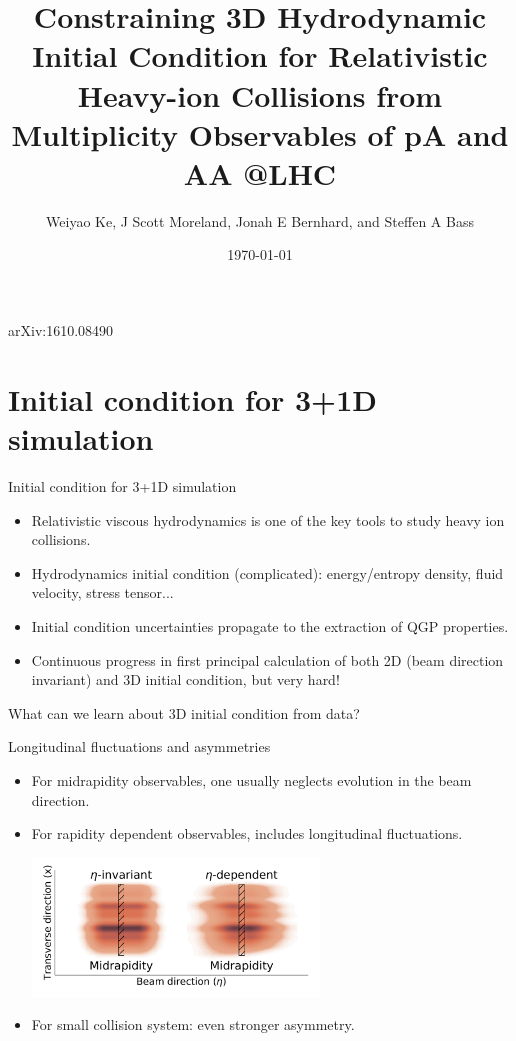 \documentclass[11pt]{beamer}
\author[Weiyao Ke]{Weiyao Ke, J Scott Moreland, Jonah E Bernhard, and Steffen A Bass}
\title[3D Initial Condition]{Constraining 3D Hydrodynamic Initial Condition for Relativistic Heavy-ion Collisions from Multiplicity Observables of pA and AA @LHC}
\institute{Duke University}
\date{\today}
\begin{document}
\begin{frame}
\titlepage
\begin{center}
\small arXiv:1610.08490
\end{center}
\end{frame}

\section{Initial condition for 3+1D simulation}
\begin{frame}{Initial condition for 3+1D simulation}
\begin{itemize}
\item Relativistic viscous hydrodynamics is one of the key tools to study heavy ion collisions.
\item Hydrodynamics initial condition (complicated): energy/entropy density, fluid velocity, stress tensor...
\item Initial condition uncertainties propagate to the extraction of QGP properties.
\item Continuous progress in first principal calculation of both 2D (beam direction invariant) and 3D initial condition, but very hard!
\end{itemize}
\begin{center}
\color{red} What can we learn about 3D initial condition from data?
\end{center}
\end{frame}

\begin{frame}{Longitudinal fluctuations and asymmetries}
\begin{itemize}
\item For midrapidity observables, one usually neglects evolution in the beam direction.
\item For rapidity dependent observables, includes longitudinal fluctuations.
\begin{center}
\includegraphics[width=0.6\textwidth]{nuclei_demo.pdf}
\end{center}
\item For small collision system: even stronger asymmetry.
\end{itemize}
\end{frame}
\end{document}
